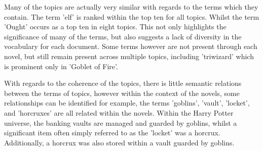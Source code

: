 \documentclass[10pt]{report}
\begin{document}
Many of the topics are actually very similar with regards to the terms which they contain. The term 'elf' is ranked within the top ten for all topics. Whilst the term 'Ought' occurs as a top ten in eight topics.  This not only highlights the significance of many of the terms, but also suggests a lack of diversity in the vocabulary for each document. Some terms however are not present through each novel, but still remain present across multiple topics, including 'triwizard' which is prominent only in 'Goblet of Fire'.

With regards to the coherence of the topics, there is little semantic relations between the terms of topics, however within the context of the novels, some relationships can be identified for example, the terms 'goblins', 'vault', 'locket', and 'horcruxes' are all related within the novels. Within the Harry Potter universe, the banking vaults are managed and guarded by goblins, whilst a significant item often simply referred to as the 'locket' was a horcrux. Additionally, a horcrux was also stored within a vault guarded by goblins. 


\clearpage
\end{document}
